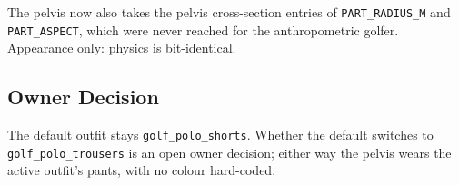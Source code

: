 The pelvis now also takes the pelvis cross-section entries of
\texttt{PART\_RADIUS\_M} and \texttt{PART\_ASPECT}, which were never reached
for the anthropometric golfer. Appearance only: physics is bit-identical.

\subsection{Owner Decision}
The default outfit stays \texttt{golf\_polo\_shorts}. Whether the default
switches to \texttt{golf\_polo\_trousers} is an open owner decision; either
way the pelvis wears the active outfit's pants, with no colour hard-coded.

